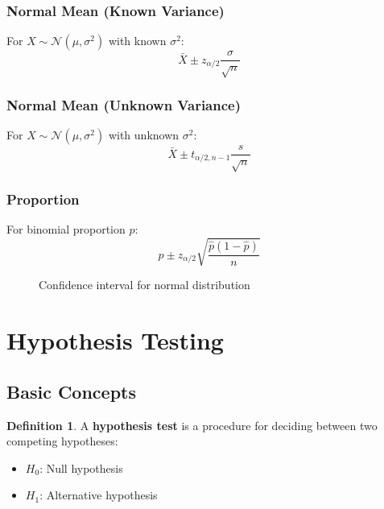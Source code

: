 \documentclass[11pt]{article}
\theoremstyle{definition}
\newtheorem{definition}{Definition}[section]
\begin{document}
\subsubsection{Normal Mean (Known Variance)}
For $X \sim \mathcal{N}(\mu, \sigma^2)$ with known $\sigma^2$:
$$\bar{X} \pm z_{\alpha/2} \frac{\sigma}{\sqrt{n}}$$

\subsubsection{Normal Mean (Unknown Variance)}
For $X \sim \mathcal{N}(\mu, \sigma^2)$ with unknown $\sigma^2$:
$$\bar{X} \pm t_{\alpha/2,n-1} \frac{s}{\sqrt{n}}$$

\subsubsection{Proportion}
For binomial proportion $p$:
$$\hat{p} \pm z_{\alpha/2} \sqrt{\frac{\hat{p}(1-\hat{p})}{n}}$$

\begin{figure}[h]
\centering
{}
\caption{Confidence interval for normal distribution}
\end{figure}

\section{Hypothesis Testing}

\subsection{Basic Concepts}
\begin{definition}
A \textbf{hypothesis test} is a procedure for deciding between two competing hypotheses:
\begin{itemize}
    \item $H_0$: Null hypothesis
    \item $H_1$: Alternative hypothesis
\end{itemize}
\end{definition}
\end{document}

